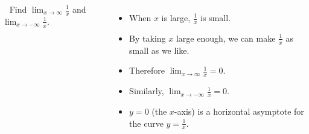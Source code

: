 \begin{frame}
\begin{example}[Example 4, p. 129]
\begin{columns}[c]
\ %
%
%
Find $\lim_{x\to\infty} \frac{1}{x}$ and $\lim_{x\to -\infty} \frac{1}{x}$.
\begin{itemize}
\item<2->  When $x$ is large, $\frac{1}{x}$ is small.
\item<3->  By taking $x$ large enough, we can make $\frac{1}{x}$ as small as we like.
\item<4->  Therefore $\lim_{x\to \infty} \frac{1}{x} = 0$.
\item<5->  Similarly, $\lim_{x\to -\infty}\frac{1}{x} = 0$.
\item<6->  $y = 0$ (the $x$-axis) is a horizontal asymptote for the curve $y = \frac{1}{x}$.
\end{itemize}
\end{columns}
\end{example}
\end{frame}
